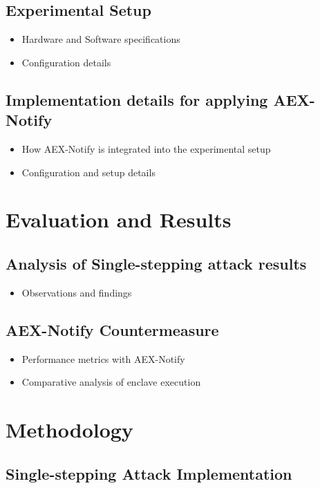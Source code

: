 \documentclass{llncs}
\begin{document}
\subsection{Experimental Setup}
\begin{itemize}
  \item Hardware and Software specifications
  \item Configuration details
\end{itemize}

\subsection{Implementation details for applying AEX-Notify}
\begin{itemize}
  \item How AEX-Notify is integrated into the experimental setup
  \item Configuration and setup details
\end{itemize}

\section{Evaluation and Results}
\subsection{Analysis of Single-stepping attack results}
\begin{itemize}
    \item Observations and findings
\end{itemize}
\subsection{AEX-Notify Countermeasure}
\begin{itemize}
    \item Performance metrics with AEX-Notify
    \item Comparative analysis of enclave execution
\end{itemize}

\section{Methodology}

\subsection{Single-stepping Attack Implementation}
\end{document}
